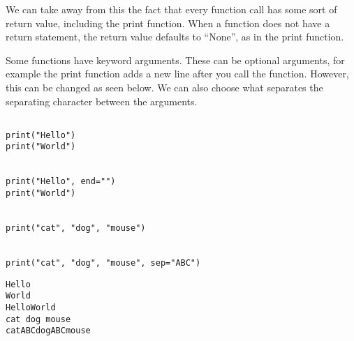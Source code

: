 \documentclass[11pt]{article}
\begin{document}
We can take away from this the fact that every function call has some sort of return value, including the print function. When a function does not have a return statement, the return value defaults to ``None'', as in the print function.


Some functions have keyword arguments. These can be optional arguments, for example the print function adds a new line after you call the function. However, this can be changed as seen below. We can also choose what separates the separating character between the arguments.


\begin{verbatim}

print("Hello")
print("World")


print("Hello", end="")
print("World")


print("cat", "dog", "mouse")


print("cat", "dog", "mouse", sep="ABC")

\end{verbatim}

\begin{verbatim}
Hello
World
HelloWorld
cat dog mouse
catABCdogABCmouse
\end{verbatim}
\end{document}
